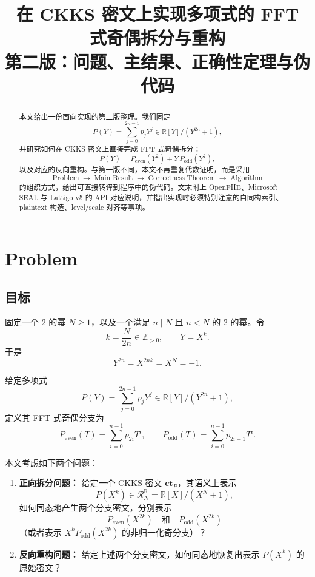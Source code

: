 \documentclass[11pt,a4paper]{ctexart}
\title{在 CKKS 密文上实现多项式的 FFT 式奇偶拆分与重构\\
\large 第二版：问题、主结果、正确性定理与伪代码}
\author{}
\date{}
\newcommand{\RR}{\mathbb{R}}
\newcommand{\ZZ}{\mathbb{Z}}
\newcommand{\Rbig}{\mathcal{R}_N^{\RR}}
\newcommand{\ctP}{\mathbf{ct}_{P}}
\newcommand{\Pe}{P_{\mathrm{even}}}
\newcommand{\Po}{P_{\mathrm{odd}}}
\begin{document}
\maketitle


\tableofcontents
\newpage

\begin{abstract}
本文给出一份面向实现的第二版整理。我们固定
\[
P(Y)=\sum_{j=0}^{2n-1}p_jY^j \in \RR[Y]/(Y^{2n}+1),
\]
并研究如何在 CKKS 密文上直接完成 FFT 式奇偶拆分：
\[
P(Y)=P_{\mathrm{even}}(Y^2)+Y\,P_{\mathrm{odd}}(Y^2),
\]
以及对应的反向重构。与第一版不同，本文不再重复代数证明，而是采用
\[
\text{Problem} \;\to\; \text{Main Result} \;\to\; \text{Correctness Theorem} \;\to\; \text{Algorithm}
\]
的组织方式，给出可直接转译到程序中的伪代码。文末附上 OpenFHE、Microsoft SEAL 与 Lattigo v5 的 API 对应说明，并指出实现时必须特别注意的自同构索引、plaintext 构造、level/scale 对齐等事项。
\end{abstract}

\section{Problem}

\subsection{目标}

固定一个 2 的幂 \(N\ge 1\)，以及一个满足 \(n\mid N\) 且 \(n<N\) 的 2 的幂。令
\[
k=\frac{N}{2n}\in \ZZ_{>0},
\qquad
Y=X^k.
\]
于是
\[
Y^{2n}=X^{2nk}=X^N=-1.
\]

给定多项式
\[
P(Y)=\sum_{j=0}^{2n-1}p_jY^j\in \RR[Y]/(Y^{2n}+1),
\]
定义其 FFT 式奇偶分支为
\begin{equation}
\Pe(T)=\sum_{i=0}^{n-1}p_{2i}T^i,
\qquad
\Po(T)=\sum_{i=0}^{n-1}p_{2i+1}T^i.
\label{eq:def-even-odd}
\end{equation}

本文考虑如下两个问题：

\begin{enumerate}[label=\textbf{P\arabic*.}]
    \item \textbf{正向拆分问题：} 给定一个 CKKS 密文 \(\ctP\)，其语义上表示
    \[
    P(X^k)\in \Rbig=\RR[X]/(X^N+1),
    \]
    如何同态地产生两个分支密文，分别表示
    \[
    \Pe(X^{2k})
    \quad\text{和}\quad
    \Po(X^{2k})
    \]
    （或者表示 \(X^k\Po(X^{2k})\) 的非归一化奇分支）？

    \item \textbf{反向重构问题：} 给定上述两个分支密文，如何同态地恢复出表示 \(P(X^k)\) 的原始密文？
\end{enumerate}
\end{document}
